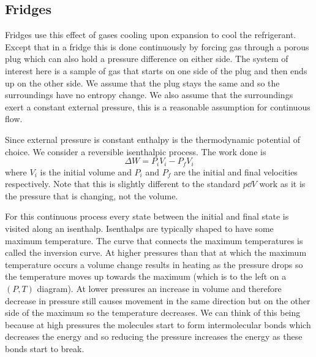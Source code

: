     \subsection{Fridges}
    Fridges use this effect of gases cooling upon expansion to cool the refrigerant.
    Except that in a fridge this is done continuously by forcing gas through a porous plug which can also hold a pressure difference on either side.
    The system of interest here is a sample of gas that starts on one side of the plug and then ends up on the other side.
    We assume that the plug stays the same and so the surroundings have no entropy change.
    We also assume that the surroundings exert a constant external pressure, this is a reasonable assumption for continuous flow.
    
    Since external pressure is constant enthalpy is the thermodynamic potential of choice.
    We consider a reversible isenthalpic process.
    The work done is
    \[\Delta W = P_iV_i - P_fV_i\]
    where \(V_i\) is the initial volume and \(P_i\) and \(P_f\) are the initial and final velocities respectively.
    Note that this is slightly different to the standard \(p\dd{V}\) work as it is the pressure that is changing, not the volume.
    
    For this continuous process every state between the initial and final state is visited along an isenthalp.
    Isenthalps are typically shaped to have some maximum temperature.
    The curve that connects the maximum temperatures is called the inversion curve.
    At higher pressures than that at which the maximum temperature occurs a volume change results in heating as the pressure drops so the temperature moves up towards the maximum (which is to the left on a \((P, T)\) diagram).
    At lower pressures an increase in volume and therefore decrease in pressure still causes movement in the same direction but on the other side of the maximum so the temperature decreases.
    We can think of this being because at high pressures the molecules start to form intermolecular bonds which decreases the energy and so reducing the pressure increases the energy as these bonds start to break.
    
